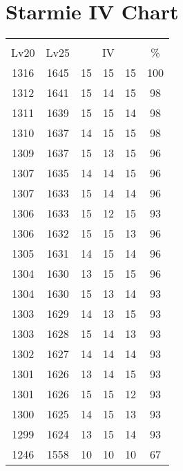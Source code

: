 \documentclass{article}%
\begin{document}
%
\normalsize%
\section{Starmie IV Chart}%
\label{sec:Starmie IV Chart}%
\renewcommand{\arraystretch}{1.5}%
\begin{tabular}{|c|c|c|c|c|c|}%
\hline%
\multicolumn{6}{|c|}{\textcolor{white}{ 
\linebreak{Starmie}
}%
\cellcolor{black}}\\%
\multicolumn{1}{|c}{Lv20}&\multicolumn{1}{c|}{Lv25}&\multicolumn{3}{c|}{IV}&\multicolumn{1}{|c|}{\%}\\%
\hline%
\rowcolor{color100}%
1316&1645&15&15&15&100\\%
\hline%
\rowcolor{color98}%
1312&1641&15&14&15&98\\%
\hline%
\rowcolor{color98}%
1311&1639&15&15&14&98\\%
\hline%
\rowcolor{color98}%
1310&1637&14&15&15&98\\%
\hline%
\rowcolor{color96}%
1309&1637&15&13&15&96\\%
\hline%
\rowcolor{color96}%
1307&1635&14&14&15&96\\%
\hline%
\rowcolor{color96}%
1307&1633&15&14&14&96\\%
\hline%
\rowcolor{color93}%
1306&1633&15&12&15&93\\%
\hline%
\rowcolor{color96}%
1306&1632&15&15&13&96\\%
\hline%
\rowcolor{color96}%
1305&1631&14&15&14&96\\%
\hline%
\rowcolor{color96}%
1304&1630&13&15&15&96\\%
\hline%
\rowcolor{color93}%
1304&1630&15&13&14&93\\%
\hline%
\rowcolor{color93}%
1303&1629&14&13&15&93\\%
\hline%
\rowcolor{color93}%
1303&1628&15&14&13&93\\%
\hline%
\rowcolor{color93}%
1302&1627&14&14&14&93\\%
\hline%
\rowcolor{color93}%
1301&1626&13&14&15&93\\%
\hline%
\rowcolor{color93}%
1301&1626&15&15&12&93\\%
\hline%
\rowcolor{color93}%
1300&1625&14&15&13&93\\%
\hline%
\rowcolor{color93}%
1299&1624&13&15&14&93\\%
\hline%
\rowcolor{color91}%
1246&1558&10&10&10&67\\%
\end{tabular}

%
\end{document}

